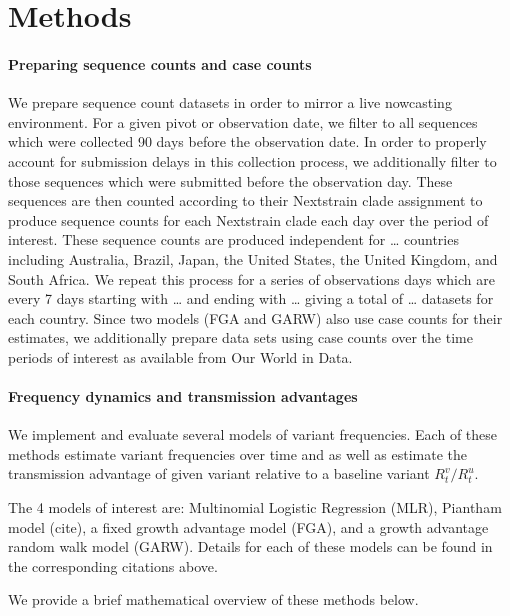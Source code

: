 \documentclass[11pt,oneside,letterpaper]{article}
\begin{document}
\section*{Methods}

\paragraph{Preparing sequence counts and case counts}

We prepare sequence count datasets in order to mirror a live nowcasting environment. 
For a given pivot or observation date, we filter to all sequences which were collected 90 days before the observation date. 
In order to properly account for submission delays in this collection process, we additionally filter to those sequences which were submitted before the observation day.
These sequences are then counted according to their Nextstrain clade assignment to produce sequence counts for each Nextstrain clade each day over the period of interest. 
These sequence counts are produced independent for … countries including Australia, Brazil, Japan, the United States, the United Kingdom, and South Africa.
We repeat this process for a series of observations days which are every 7 days starting with … and ending with … giving a total of … datasets for each country.
Since two models (FGA and GARW) also use case counts for their estimates, we additionally prepare data sets using case counts over the time periods of interest as available from Our World in Data.

\paragraph{Frequency dynamics and transmission advantages}%

We implement and evaluate several models of variant frequencies.
Each of these methods estimate variant frequencies over time and as well as estimate the transmission advantage of given variant relative to a baseline variant $R_{t}^{v} / R_{t}^{u}$.

The 4 models of interest are: Multinomial Logistic Regression (MLR), Piantham model (cite), a fixed growth advantage model (FGA), and a growth advantage random walk model (GARW). 
Details for each of these models can be found in the corresponding citations above.

We provide a brief mathematical overview of these methods below.
\end{document}
